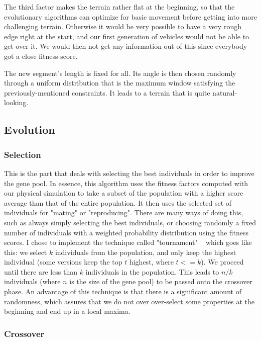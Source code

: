 \documentclass[12pt,Bold,letterpaper,TexShade]{mcgilletdclass}
\begin{document}
The third factor makes the terrain rather flat at the beginning, so that the evolutionary algorithms can optimize for basic movement before getting into more challenging terrain. Otherwise it would be very possible to have a very rough edge right at the start, and our first generation of vehicles would not be able to get over it. We would then not get any information out of this since everybody got a close fitness score.

The new segment's length is fixed for all. Its angle is then chosen randomly through a uniform distribution that is the maximum window satisfying the previously-mentioned constraints. It leads to a terrain that is quite natural-looking.

\subsection{Evolution}

\subsubsection{Selection}

This is the part that deals with selecting the best individuals in order to improve the gene pool. In essence, this algorithm uses the fitness factors computed with our physical simulation to take a subset of the population with a higher score average than that of the entire population. It then uses the selected set of individuals for "mating" or "reproducing". There are many ways of doing this, such as always simply selecting the best individuals, or choosing randomly a fixed number of individuals with a weighted probability distribution using the fitness scores. I chose to implement the technique called "tournament" ~\cite{miller1995genetic} which goes like this: we select $k$ individuals from the population, and only keep the highest individual (some versions keep the top $t$ highest, where $t<=k$). We proceed until there are less than $k$ individuals in the population. This leads to $n/k$ individuals (where $n$ is the size of the gene pool) to be passed onto the crossover phase. An advantage of this technique is that there is a significant amount of randomness, which assures that we do not over over-select some properties at the beginning and end up in a local maxima.

\subsubsection{Crossover}
\end{document}
